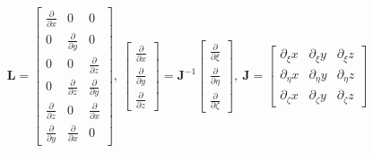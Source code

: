 \documentclass[materials,article,submit,moreauthors,pdftex]{Definitions/mdpi}
\begin{document}
\begin{eqnarray}
\textbf{L}=\left [
\begin{array}{ccc}
\frac{\partial }{\partial x} & 0 & 0\\
0 & \frac{\partial }{\partial y} & 0\\
0 & 0 & \frac{\partial }{\partial z}\\
0 & \frac{\partial }{\partial z} & \frac{\partial }{\partial y}\\
\frac{\partial }{\partial z} & 0 & \frac{\partial }{\partial x}\\
\frac{\partial }{\partial y} & \frac{\partial }{\partial x} & 0
\end{array} \right],\ 
\left [
\begin{array}{c}
\frac{\partial }{\partial x}\\
\frac{\partial }{\partial y}\\
\frac{\partial }{\partial z}
\end{array} \right] =\textbf{J}^{-1}
\left [
\begin{array}{c}
\frac{\partial }{\partial \xi}\\
\frac{\partial }{\partial \eta}\\
\frac{\partial }{\partial \zeta}
\end{array} \right], \ 
\textbf{J}=\left [
\begin{array}{ccc}
\partial_\xi x & {\partial_\xi y} & {\partial_\xi z}\\
\partial_\eta x & {\partial_\eta y} & {\partial_\eta z}\\
\partial_\zeta x & {\partial_\zeta y} & {\partial_\zeta z}
\end{array} \right]
\end{eqnarray}
\end{document}
